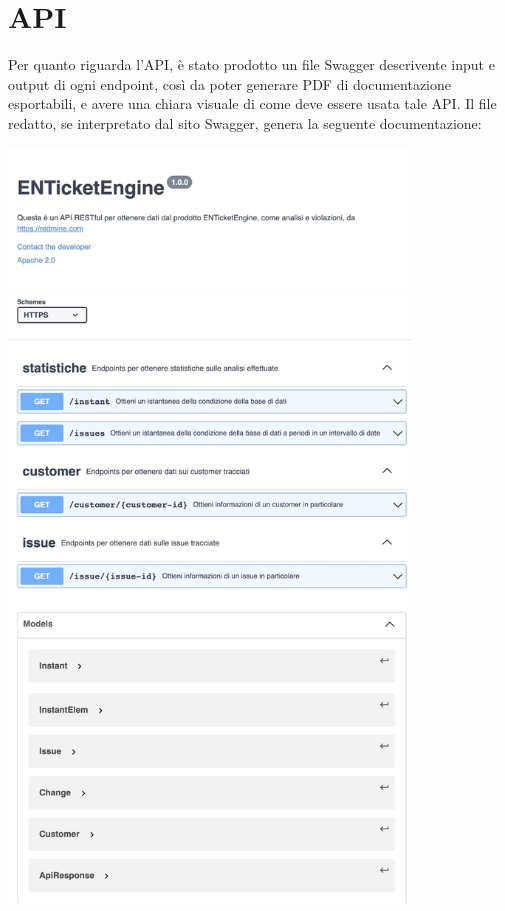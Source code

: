 	\section{API}
		Per quanto riguarda l'API, è stato prodotto un file Swagger descrivente input e output di ogni endpoint, così da poter generare PDF di documentazione esportabili, e avere una chiara visuale di come deve essere usata tale API.
		Il file redatto, se interpretato dal sito Swagger, genera la seguente documentazione:
		\begin{center}
			\includegraphics[keepaspectratio = true, height=20cm]{immagini/swagger.png}
		\end{center}